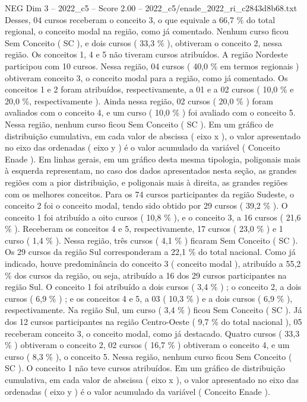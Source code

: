 \begin{textsample}{NEG Dim 3 – 2022\_c5 – Score 2.00 – 2022\_c5/enade\_2022\_ri\_c2843d8b68.txt}
Desses, 04 cursos receberam o conceito 3, o que equivale a 66,7 \% do total regional, o conceito modal na região, como já comentado.
Nenhum curso ficou Sem Conceito ( SC ), e dois cursos ( 33,3 \% ), obtiveram o conceito 2, nessa região.
Os conceitos 1, 4 e 5 não tiveram cursos atribuídos.
A região Nordeste participou com 10 cursos.
Nessa região, 04 cursos ( 40,0 \% em termos regionais ) obtiveram conceito 3, o conceito modal para a região, como já comentado.
Os conceitos 1 e 2 foram atribuídos, respectivamente, a 01 e a 02 cursos ( 10,0 \% e 20,0 \%, respectivamente ).
Ainda nessa região, 02 cursos ( 20,0 \% ) foram avaliados com o conceito 4, e um curso ( 10,0 \% ) foi avaliado com o conceito 5.
Nessa região, nenhum curso ficou Sem Conceito ( SC ).
Em um gráfico de distribuição cumulativa, em cada valor de abscissa ( eixo x ), o valor apresentado no eixo das ordenadas ( eixo y ) é o valor acumulado da variável ( Conceito Enade ).
Em linhas gerais, em um gráfico desta mesma tipologia, poligonais mais à esquerda representam, no caso dos dados apresentados nesta seção, as grandes regiões com a pior distribuição, e poligonais mais à direita, as grandes regiões com os melhores conceitos.
Para os 74 cursos participantes da região Sudeste, o conceito 2 foi o conceito modal, tendo sido obtido por 29 cursos ( 39,2 \% ).
O conceito 1 foi atribuído a oito cursos ( 10,8 \% ), e o conceito 3, a 16 cursos ( 21,6 \% ).
Receberam os conceitos 4 e 5, respectivamente, 17 cursos ( 23,0 \% ) e 1 curso ( 1,4 \% ).
Nessa região, três cursos ( 4,1 \% ) ficaram Sem Conceito ( SC ).
Os 29 cursos da região Sul corresponderam a 22,1 \% do total nacional.
Como já indicado, houve predominância do conceito 3 ( conceito modal ), atribuído a 55,2 \% dos cursos da região, ou seja, atribuído a 16 dos 29 cursos participantes na região Sul.
O conceito 1 foi atribuído a dois cursos ( 3,4 \% ) ; o conceito 2, a dois cursos ( 6,9 \% ) ; e os conceitos 4 e 5, a 03 ( 10,3 \% ) e a dois cursos ( 6,9 \% ), respectivamente.
Na região Sul, um curso ( 3,4 \% ) ficou Sem Conceito ( SC ).
Já dos 12 cursos participantes na região Centro-Oeste ( 9,7 \% do total nacional ), 05 receberam conceito 3, o conceito modal, como já destacado.
Quatro cursos ( 33,3 \% ) obtiveram o conceito 2, 02 cursos ( 16,7 \% ) obtiveram o conceito 4, e um curso ( 8,3 \% ), o conceito 5.
Nessa região, nenhum curso ficou Sem Conceito ( SC ).
O conceito 1 não teve cursos atribuídos.
Em um gráfico de distribuição cumulativa, em cada valor de abscissa ( eixo x ), o valor apresentado no eixo das ordenadas ( eixo y ) é o valor acumulado da variável ( Conceito Enade ).

\end{textsample}
